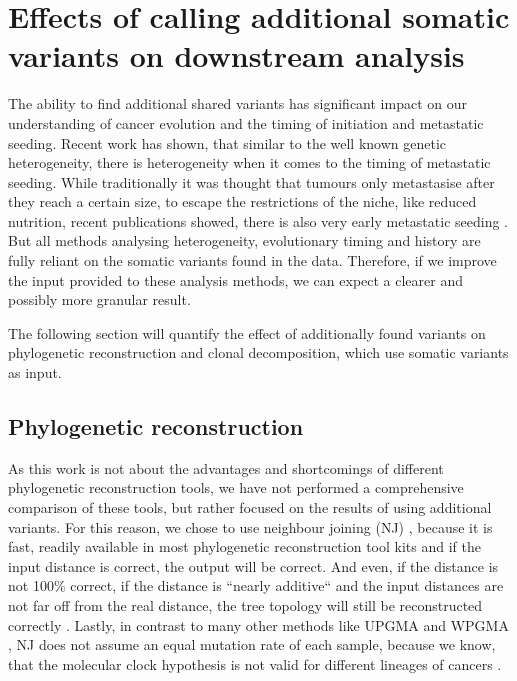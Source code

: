\section[Effects on downstream analysis]{Effects of calling additional somatic variants on downstream analysis}
\label{variantcalling-sec:downstream}

The ability to find additional shared variants has significant impact on our understanding of cancer evolution and the timing of initiation and metastatic seeding. Recent work has shown, that similar to the well known genetic heterogeneity, there is heterogeneity when it comes to the timing of metastatic seeding. While traditionally it was thought that tumours only metastasise after they reach a certain size, to escape the restrictions of the niche, like reduced nutrition, recent publications showed, there is also very early metastatic seeding \cite{Hu2019}. 
But all methods analysing heterogeneity, evolutionary timing and history are fully reliant on the somatic variants found in the data. Therefore, if we improve the input provided to these analysis methods, we can expect a clearer and possibly more granular result.

The following section will quantify the effect of additionally found variants on phylogenetic reconstruction and clonal decomposition, which use somatic variants as input.


\subsection[Phylogenetic reconstruction]{Phylogenetic reconstruction}
\label{variantcalling-sec:phylo}
As this work is not about the advantages and shortcomings of different phylogenetic reconstruction tools, we have not performed a comprehensive comparison of these tools, but rather focused on the results of using additional variants.  For this reason, we chose to use neighbour joining (NJ) \cite{Saitou1987}, because it is fast, readily available in most phylogenetic reconstruction tool kits and if the input distance is correct, the output will be correct. And even, if the distance is not 100\% correct, if the distance is ``nearly additive`` and the input distances are not far off from the real distance, the tree topology will still be reconstructed correctly \cite{Mihaescu2007}. Lastly, in contrast to many other methods like UPGMA and WPGMA \cite{Sokal1958}, NJ does not assume an equal mutation rate of each sample, because we know, that the molecular clock hypothesis \cite{Zuckerkandl1962} is not valid for different lineages of cancers \cite{Shibata2010}.

